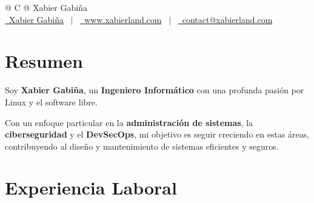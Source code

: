 \documentclass[a4paper,12pt]{article}
\begin{document}
\pagestyle{empty} 


\begin{tabularx}{\linewidth}{@{} C @{}}
\Huge{Xabier Gabiña} \\[7.5pt]
\href{https://linkedin.com/in/xabier-gabina}{\raisebox{-0.05\height}\faLinkedin\ Xabier Gabiña} \ $|$ \ 
\href{https://www.xabierland.com/}{\raisebox{-0.05\height}\faGlobe \ www.xabierland.com} \ $|$ \ 
\href{mailto:contact@xabierland.com}{\raisebox{-0.05\height}\faEnvelope \ contact@xabierland.com} \ %
\end{tabularx}


\section{Resumen}
Soy \textbf{Xabier Gabiña}, un \textbf{Ingeniero Informático} con una profunda pasión por Linux y el software libre.

Con un enfoque particular en la \textbf{administración de sistemas}, la \textbf{ciberseguridad} y el \textbf{DevSecOps}, mi objetivo es seguir creciendo en estas áreas, contribuyendo al diseño y mantenimiento de sistemas eficientes y seguros.

\section{Experiencia Laboral}

\end{document}
